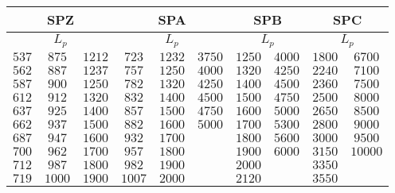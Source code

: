 \begin{table}[]
\centering\tiny
\begin{tabular}{|c|c|c|c|c|c|c|c|c|c|}
\hline
\multicolumn{3}{|c|}{\textbf{SPZ}} & \multicolumn{3}{c|}{\textbf{SPA}} & \multicolumn{2}{c|}{\textbf{SPB}} & \multicolumn{2}{c|}{\textbf{SPC}} \\ \hline
\multicolumn{3}{|c|}{$L_p$}        & \multicolumn{3}{c|}{$L_p$}        & \multicolumn{2}{c|}{$L_p$}        & \multicolumn{2}{c|}{$L_p$}        \\ \hline
$537$       & $875$        & $1212$      & $723$       & $1232$      & $3750$      & $1250$            & $4000$            & $1800$            & $6700$            \\ \hline
$562$       & $887$        & $1237$      & $757$       & $1250$      & $4000$      & $1320$            & $4250$            & $2240$            & $7100$            \\ \hline
$587$       & $900$        & $1250$      & $782$       & $1320$      & $4250$      & $1400$            & $4500$            & $2360$            & $7500$            \\ \hline
$612$       & $912$        & $1320$      & $832$       & $1400$      & $4500$      & $1500$            & $4750$            & $2500$            & $8000$            \\ \hline
$637$       & $925$        & $1400$      & $857$       & $1500$      & $4750$      & $1600$            & $5000$            & $2650$            & $8500$            \\ \hline
$662$       & $937$        & $1500$      & $882$       & $1600$      & $5000$      & $1700$            & $5300$            & $2800$            & $9000$            \\ \hline
$687$       & $947$        & $1600$      & $932$       & $1700$      &           & $1800$            & $5600$            & $3000$            & $9500$            \\ \hline
$700$       & $962$        & $1700$      & $957$       & $1800$      &           & $1900$            & $6000$            & $3150$            & $10000$           \\ \hline
$712$       & $987$        & $1800$      & $982$       & $1900$      &           & $2000$            &                 & $3350$            &                 \\ \hline
$719$       & $1000$       & $1900$      & $1007$      & $2000$      &           & $2120$            &                 & $3550$            &                 \\ \hline

\end{tabular}
\end{table}

